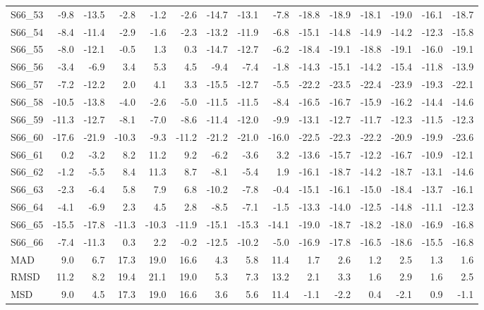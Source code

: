 \begin{longtable}{lrrrrrrrrrrrrrr}
S66\_53 & -9.8 & -13.5 & -2.8 & -1.2 & -2.6 & -14.7 & -13.1 & -7.8 & -18.8 & -18.9 & -18.1 & -19.0 & -16.1 & -18.7 \\
S66\_54 & -8.4 & -11.4 & -2.9 & -1.6 & -2.3 & -13.2 & -11.9 & -6.8 & -15.1 & -14.8 & -14.9 & -14.2 & -12.3 & -15.8 \\
S66\_55 & -8.0 & -12.1 & -0.5 & 1.3 & 0.3 & -14.7 & -12.7 & -6.2 & -18.4 & -19.1 & -18.8 & -19.1 & -16.0 & -19.1 \\
S66\_56 & -3.4 & -6.9 & 3.4 & 5.3 & 4.5 & -9.4 & -7.4 & -1.8 & -14.3 & -15.1 & -14.2 & -15.4 & -11.8 & -13.9 \\
S66\_57 & -7.2 & -12.2 & 2.0 & 4.1 & 3.3 & -15.5 & -12.7 & -5.5 & -22.2 & -23.5 & -22.4 & -23.9 & -19.3 & -22.1 \\
S66\_58 & -10.5 & -13.8 & -4.0 & -2.6 & -5.0 & -11.5 & -11.5 & -8.4 & -16.5 & -16.7 & -15.9 & -16.2 & -14.4 & -14.6 \\
S66\_59 & -11.3 & -12.7 & -8.1 & -7.0 & -8.6 & -11.4 & -12.0 & -9.9 & -13.1 & -12.7 & -11.7 & -12.3 & -11.5 & -12.3 \\
S66\_60 & -17.6 & -21.9 & -10.3 & -9.3 & -11.2 & -21.2 & -21.0 & -16.0 & -22.5 & -22.3 & -22.2 & -20.9 & -19.9 & -23.6 \\
S66\_61 & 0.2 & -3.2 & 8.2 & 11.2 & 9.2 & -6.2 & -3.6 & 3.2 & -13.6 & -15.7 & -12.2 & -16.7 & -10.9 & -12.1 \\
S66\_62 & -1.2 & -5.5 & 8.4 & 11.3 & 8.7 & -8.1 & -5.4 & 1.9 & -16.1 & -18.7 & -14.2 & -18.7 & -13.1 & -14.6 \\
S66\_63 & -2.3 & -6.4 & 5.8 & 7.9 & 6.8 & -10.2 & -7.8 & -0.4 & -15.1 & -16.1 & -15.0 & -18.4 & -13.7 & -16.1 \\
S66\_64 & -4.1 & -6.9 & 2.3 & 4.5 & 2.8 & -8.5 & -7.1 & -1.5 & -13.3 & -14.0 & -12.5 & -14.8 & -11.1 & -12.3 \\
S66\_65 & -15.5 & -17.8 & -11.3 & -10.3 & -11.9 & -15.1 & -15.3 & -14.1 & -19.0 & -18.7 & -18.2 & -18.0 & -16.9 & -16.8 \\
S66\_66 & -7.4 & -11.3 & 0.3 & 2.2 & -0.2 & -12.5 & -10.2 & -5.0 & -16.9 & -17.8 & -16.5 & -18.6 & -15.5 & -16.8 \\
MAD & 9.0 & 6.7 & 17.3 & 19.0 & 16.6 & 4.3 & 5.8 & 11.4 & 1.7 & 2.6 & 1.2 & 2.5 & 1.3 & 1.6 \\
RMSD & 11.2 & 8.2 & 19.4 & 21.1 & 19.0 & 5.3 & 7.3 & 13.2 & 2.1 & 3.3 & 1.6 & 2.9 & 1.6 & 2.5 \\
MSD & 9.0 & 4.5 & 17.3 & 19.0 & 16.6 & 3.6 & 5.6 & 11.4 & -1.1 & -2.2 & 0.4 & -2.1 & 0.9 & -1.1 \\
\bottomrule
\end{longtable}